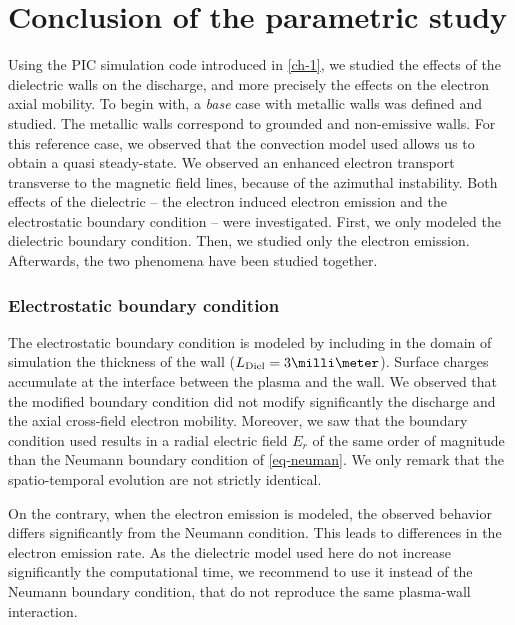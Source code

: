 
\section{Conclusion of the parametric study}
  \label{sec-conclusion_ch2}
  
  Using the \ac{PIC} simulation code introduced in \cref{ch-1}, we studied the effects of the dielectric walls on the discharge, and more precisely the effects on the electron axial mobility.
  To begin with, a \emph{base} case with metallic walls was defined and studied.
  The metallic walls correspond to grounded and non-emissive walls.
  For this reference case, we observed that the convection model used allows us to obtain a quasi steady-state.
  We observed an enhanced electron transport transverse to the magnetic field lines, because of the azimuthal instability.
  Both effects of the dielectric -- the electron induced electron emission and the electrostatic boundary condition -- were investigated.
  First, we  only modeled the dielectric boundary condition. Then, we studied only the electron emission. Afterwards, the two phenomena have been studied together.
  
  \subsubsection*{Electrostatic boundary condition}
  
  The electrostatic boundary condition is modeled by including in the domain of simulation the thickness of the wall ($L_{\rm Diel} = 3 \milli\meter$).
  Surface charges accumulate at the interface between the plasma and the wall.
  We observed that the modified boundary condition did not modify significantly the discharge and the axial cross-field electron mobility.
  Moreover, we saw that the boundary condition used results in a radial electric field $E_r$ of the same order of magnitude than the Neumann boundary condition of \cref{eq-neuman}.
  We only remark that the spatio-temporal evolution are not strictly identical.
  
  On the contrary, when the electron emission is modeled, the observed behavior differs significantly from the Neumann condition.
  This leads to differences in the electron emission rate.
  As the dielectric model used here do not increase significantly the computational time, we recommend to use it instead of the Neumann boundary condition, that do not reproduce the same plasma-wall interaction.
  
